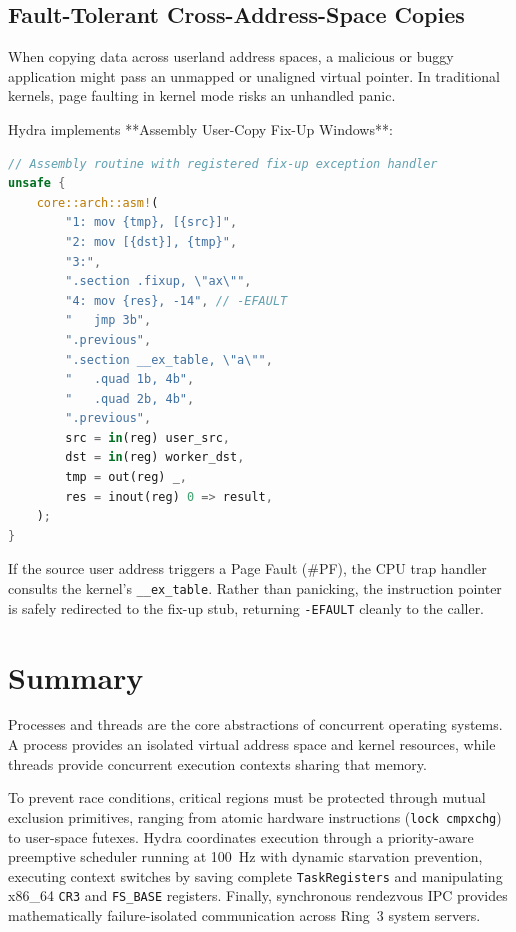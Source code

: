 \subsection{Fault-Tolerant Cross-Address-Space Copies}
When copying data across userland address spaces, a malicious or buggy application might pass an unmapped or unaligned virtual pointer. In traditional kernels, page faulting in kernel mode risks an unhandled panic.

Hydra implements **Assembly User-Copy Fix-Up Windows**:
\begin{lstlisting}[language=Rust, caption={User-Copy Fault Fix-Up Pattern}]
// Assembly routine with registered fix-up exception handler
unsafe {
    core::arch::asm!(
        "1: mov {tmp}, [{src}]",
        "2: mov [{dst}], {tmp}",
        "3:",
        ".section .fixup, \"ax\"",
        "4: mov {res}, -14", // -EFAULT
        "   jmp 3b",
        ".previous",
        ".section __ex_table, \"a\"",
        "   .quad 1b, 4b",
        "   .quad 2b, 4b",
        ".previous",
        src = in(reg) user_src,
        dst = in(reg) worker_dst,
        tmp = out(reg) _,
        res = inout(reg) 0 => result,
    );
}
\end{lstlisting}
If the source user address triggers a Page Fault (\#PF), the CPU trap handler consults the kernel's \texttt{\_\_ex\_table}. Rather than panicking, the instruction pointer is safely redirected to the fix-up stub, returning \texttt{-EFAULT} cleanly to the caller.

\section{Summary}
\label{sec:summary_chap2}

Processes and threads are the core abstractions of concurrent operating systems. A process provides an isolated virtual address space and kernel resources, while threads provide concurrent execution contexts sharing that memory. 

To prevent race conditions, critical regions must be protected through mutual exclusion primitives, ranging from atomic hardware instructions (\texttt{lock cmpxchg}) to user-space futexes. Hydra coordinates execution through a priority-aware preemptive scheduler running at 100~Hz with dynamic starvation prevention, executing context switches by saving complete \texttt{TaskRegisters} and manipulating x86\_64 \texttt{CR3} and \texttt{FS\_BASE} registers. Finally, synchronous rendezvous IPC provides mathematically failure-isolated communication across Ring~3 system servers.

